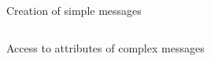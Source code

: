 \begin{subfigure}{\textwidth}
    \centering
    \inputminted{python}{code/exampleMessageCreation.py}
    \caption{%
        Creation of simple messages
    }
\end{subfigure}
\begin{subfigure}{\textwidth}
    \centering
    \inputminted{python}{code/exampleMessageAccess.py}
    \caption{%
        Access to attributes of complex messages
    }
\end{subfigure}

